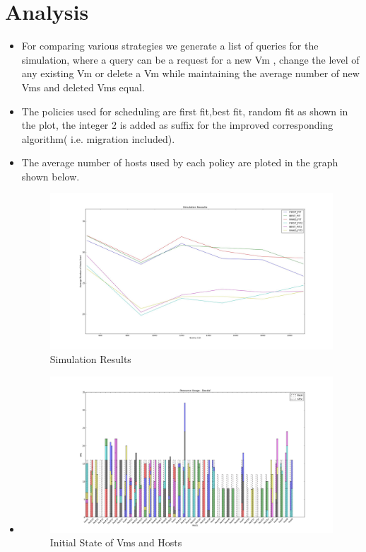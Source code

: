 \documentclass[a4paper,10pt]{article}
\begin{document}
\section{Analysis}

\begin{itemize}
\item{For comparing various strategies we generate a list of queries for the simulation, where a query can be a request for a new Vm , change the level of any existing Vm or delete a Vm while maintaining the average number of new Vms and  deleted Vms equal.
}

\item{The policies used for scheduling are first fit,best fit, random fit as shown in the plot, the integer 2 is added as suffix for the improved corresponding algorithm( i.e. migration included).
}


\item{The average number of hosts used by each policy are ploted in the graph shown below. 
\begin{figure}
 \centering
  \includegraphics[width=1\textwidth]{7}
 \caption{Simulation Results}
 \end{figure}
}


\item{
\begin{figure}
  \includegraphics[width=1.1\textwidth]{h1}
 \caption{Initial State of Vms and Hosts}
 \end{figure}
 
}
\end{itemize}
\end{document}
